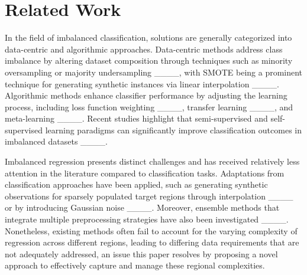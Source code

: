 \section{Related Work}
In the field of imbalanced classification, solutions are generally categorized into data-centric and algorithmic approaches. Data-centric methods address class imbalance by altering dataset composition through techniques such as minority oversampling or majority undersampling ____, with SMOTE being a prominent technique for generating synthetic instances via linear interpolation ____. Algorithmic methods enhance classifier performance by adjusting the learning process, including loss function weighting ____, transfer learning ____, and meta-learning ____. Recent studies highlight that semi-supervised and self-supervised learning paradigms can significantly improve classification outcomes in imbalanced datasets ____.

Imbalanced regression presents distinct challenges and has received relatively less attention in the literature compared to classification tasks. Adaptations from classification approaches have been applied, such as generating synthetic observations for sparsely populated target regions through interpolation ____ or by introducing Gaussian noise ____. Moreover, ensemble methods that integrate multiple preprocessing strategies have also been investigated ____. Nonetheless, existing methods often fail to account for the varying complexity of regression across different regions, leading to differing data requirements that are not adequately addressed, an issue this paper resolves by proposing a novel approach to effectively capture and manage these regional complexities.